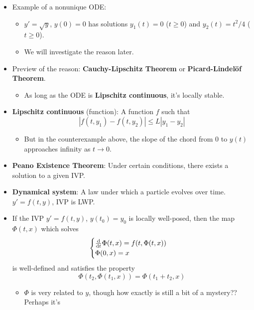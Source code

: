 \documentclass[../notes.tex]{subfiles}
\begin{document}
\begin{itemize}
\begin{enumerate}
    \end{enumerate}
    \item Example of a nonunique ODE:
    \begin{itemize}
        \item $y'=\sqrt{y}$, $y(0)=0$ has solutions $y_1(t)=0$ ($t\geq 0$) and $y_2(t)=t^2/4$ ($t\geq 0$).
        \item We will investigate the reason later.
    \end{itemize}
    \item Preview of the reason: \textbf{Cauchy-Lipschitz Theorem} or \textbf{Picard-Lindel\"{o}f Theorem}.
    \begin{itemize}
        \item As long as the ODE is \textbf{Lipschitz continuous}, it's locally stable.
    \end{itemize}
    \item \textbf{Lipschitz continuous} (function): A function $f$ such that
    \begin{equation*}
        |f(t,y_1)-f(t,y_2)| \leq L|y_1-y_2|
    \end{equation*}
    \begin{itemize}
        \item But in the counterexample above, the slope of the chord from 0 to $y(t)$ approaches infinity as $t\to 0$.
    \end{itemize}
    \item \textbf{Peano Existence Theorem}: Under certain conditions, there exists a solution to a given IVP.
    \item \textbf{Dynamical system}: A law under which a particle evolves over time. $y'=f(t,y)$, IVP is LWP.
    \item If the IVP $y'=f(t,y)$, $y(t_0)=y_0$ is locally well-posed, then the map $\Phi(t,x)$ which solves
    \begin{equation*}
        \begin{cases}
            \dv{t}\Phi(t,x) = f(t,\Phi(t,x))\\
            \Phi(0,x) = x
        \end{cases}
    \end{equation*}
    is well-defined and satisfies the property
    \begin{equation*}
        \Phi(t_2,\Phi(t_1,x)) = \Phi(t_1+t_2,x)
    \end{equation*}
    \begin{itemize}
        \item $\Phi$ is very related to $y$, though how exactly is still a bit of a mystery?? Perhaps it's

\end{itemize}
\end{itemize}
\end{document}
